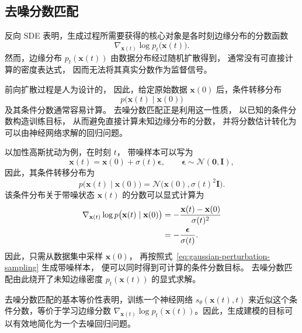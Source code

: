 \documentclass[UTF8,a4paper,zihao=-4,oneside,openany]{ctexbook}
\begin{document}
\subsection{去噪分数匹配}


反向 SDE 表明，生成过程所需要获得的核心对象是各时刻边缘分布的分数函数
\[
    \nabla_{\mathbf{x}(t)}
    \log p_t\bigl(\mathbf{x}(t)\bigr).
\]
然而，边缘分布
\(p_t(\mathbf{x}(t))\)
由数据分布经过随机扩散得到，
通常没有可直接计算的密度表达式，
因而无法将其真实分数作为监督信号。

前向扩散过程是人为设计的，
因此，给定原始数据
\(\mathbf{x}(0)\)
后，条件转移分布
\[
    p\bigl(\mathbf{x}(t)\mid\mathbf{x}(0)\bigr)
\]
及其条件分数通常容易计算。
去噪分数匹配正是利用这一性质，
以已知的条件分数构造训练目标，
从而避免直接计算未知边缘分布的分数，
并将分数估计转化为可以由神经网络求解的回归问题。

以加性高斯扰动为例，在时刻 \(t\)，
带噪样本可以写为
\begin{equation}
    \mathbf{x}(t)
    =
    \mathbf{x}(0)
    +
    \sigma(t)\boldsymbol{\epsilon},
    \qquad
    \boldsymbol{\epsilon}
    \sim
    \mathcal{N}(\mathbf{0},\mathbf{I}),
    \label{eq:gaussian-perturbation-sampling}
\end{equation}
因此，其条件转移分布为
\begin{equation}
    p\bigl(\mathbf{x}(t)\mid\mathbf{x}(0)\bigr)
    =
    \mathcal{N}
    \bigl(
        \mathbf{x}(0),
        \sigma(t)^2\mathbf{I}
    \bigr).
    \label{eq:gaussian-perturbation-kernel}
\end{equation}
该条件分布关于带噪状态
\(\mathbf{x}(t)\)
的分数可以显式计算为
\begin{align}
    \nabla_{\mathbf{x}(t)}
    \log
    p\bigl(\mathbf{x}(t)\mid\mathbf{x}(0)\bigr)
    &=
    -
    \frac{
        \mathbf{x}(t)-\mathbf{x}(0)
    }{
        \sigma(t)^2
    }
    \notag\\
    &=
    -
    \frac{
        \boldsymbol{\epsilon}
    }{
        \sigma(t)
    }.
    \label{eq:gaussian-conditional-score}
\end{align}
因此，只需从数据集中采样
\(\mathbf{x}(0)\)，
再按照式~\eqref{eq:gaussian-perturbation-sampling}
生成带噪样本，
便可以同时得到可计算的条件分数目标。
去噪分数匹配由此绕开了未知边缘密度
\(p_t(\mathbf{x}(t))\)
的显式求解。

去噪分数匹配的基本等价性表明，训练一个神经网络 $s_\theta(\mathbf{x}(t), t)$ 来近似这个条件分数，等价于学习边缘分数 $\nabla_{\mathbf{x}(t)} \log p_t(\mathbf{x}(t))$。因此，生成建模的目标可以有效地简化为一个去噪回归问题。
\end{document}

